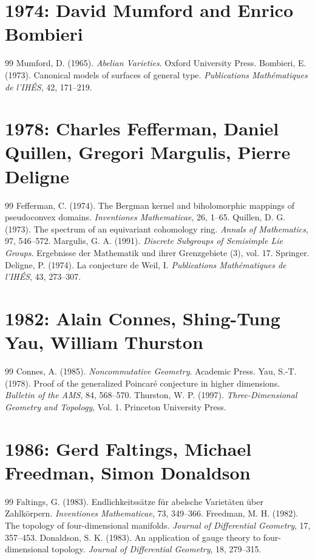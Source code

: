 \documentclass[12pt,a4paper]{book}
\theoremstyle{definition}
\theoremstyle{remark}
\begin{document}
\section*{1974: David Mumford and Enrico Bombieri}
\begin{thebibliography}{99}
 Mumford, D. (1965). \emph{Abelian Varieties}. Oxford University Press.
 Bombieri, E. (1973). Canonical models of surfaces of general type. \emph{Publications Mathématiques de l'IHÉS}, 42, 171--219.
\end{thebibliography}

\section*{1978: Charles Fefferman, Daniel Quillen, Gregori Margulis, Pierre Deligne}
\begin{thebibliography}{99}
 Fefferman, C. (1974). The Bergman kernel and biholomorphic mappings of pseudoconvex domains. \emph{Inventiones Mathematicae}, 26, 1--65.
 Quillen, D. G. (1973). The spectrum of an equivariant cohomology ring. \emph{Annals of Mathematics}, 97, 546--572.
 Margulis, G. A. (1991). \emph{Discrete Subgroups of Semisimple Lie Groups}. Ergebnisse der Mathematik und ihrer Grenzgebiete (3), vol. 17. Springer.
 Deligne, P. (1974). La conjecture de Weil, I. \emph{Publications Mathématiques de l'IHÉS}, 43, 273--307.
\end{thebibliography}

\section*{1982: Alain Connes, Shing-Tung Yau, William Thurston}
\begin{thebibliography}{99}
 Connes, A. (1985). \emph{Noncommutative Geometry}. Academic Press.
 Yau, S.-T. (1978). Proof of the generalized Poincaré conjecture in higher dimensions. \emph{Bulletin of the AMS}, 84, 568--570.
 Thurston, W. P. (1997). \emph{Three-Dimensional Geometry and Topology}, Vol. 1. Princeton University Press.
\end{thebibliography}

\section*{1986: Gerd Faltings, Michael Freedman, Simon Donaldson}
\begin{thebibliography}{99}
 Faltings, G. (1983). Endlichkeitssätze für abelsche Varietäten über Zahlkörpern. \emph{Inventiones Mathematicae}, 73, 349--366.
 Freedman, M. H. (1982). The topology of four-dimensional manifolds. \emph{Journal of Differential Geometry}, 17, 357--453.
 Donaldson, S. K. (1983). An application of gauge theory to four-dimensional topology. \emph{Journal of Differential Geometry}, 18, 279--315.
\end{thebibliography}
\end{document}
